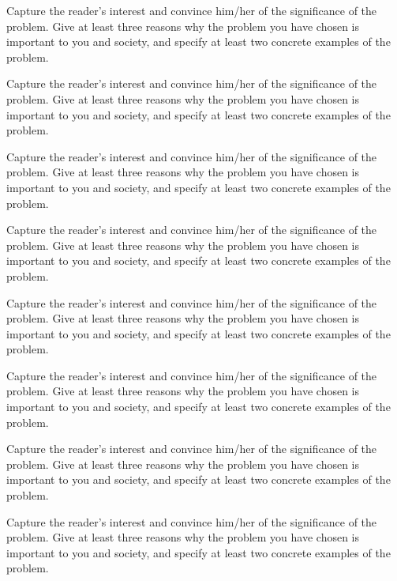 Capture the reader's interest and convince him/her of the significance of the problem.
Give at least three reasons why the problem you have chosen is important to you and society, and specify at least two concrete examples of the problem.

Capture the reader's interest and convince him/her of the significance of the problem.
Give at least three reasons why the problem you have chosen is important to you and society, and specify at least two concrete examples of the problem.

Capture the reader's interest and convince him/her of the significance of the problem.
Give at least three reasons why the problem you have chosen is important to you and society, and specify at least two concrete examples of the problem.


Capture the reader's interest and convince him/her of the significance of the problem.
Give at least three reasons why the problem you have chosen is important to you and society, and specify at least two concrete examples of the problem.

Capture the reader's interest and convince him/her of the significance of the problem.
Give at least three reasons why the problem you have chosen is important to you and society, and specify at least two concrete examples of the problem.

Capture the reader's interest and convince him/her of the significance of the problem.
Give at least three reasons why the problem you have chosen is important to you and society, and specify at least two concrete examples of the problem.

Capture the reader's interest and convince him/her of the significance of the problem.
Give at least three reasons why the problem you have chosen is important to you and society, and specify at least two concrete examples of the problem.

Capture the reader's interest and convince him/her of the significance of the problem.
Give at least three reasons why the problem you have chosen is important to you and society, and specify at least two concrete examples of the problem.
